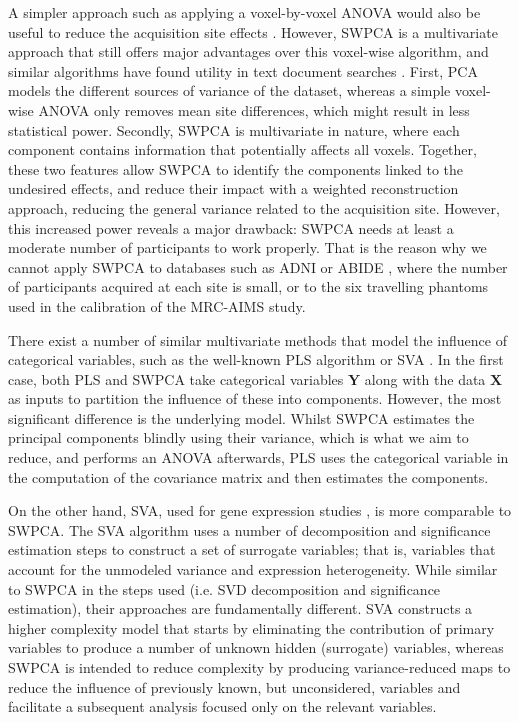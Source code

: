 A simpler approach such as applying a voxel-by-voxel \ac{ANOVA} would also be useful to reduce the acquisition site effects \cite{Suckling2012}. However, \ac{SWPCA} is a multivariate approach that still offers major advantages over this voxel-wise algorithm, and similar algorithms have found utility in text document searches \cite{Kriegel2008,tavoli2013}. First, \ac{PCA} models the different sources of variance of the dataset, whereas a simple voxel-wise \ac{ANOVA} only removes mean site differences, which might result in less statistical power. Secondly, \ac{SWPCA} is multivariate in nature, where each component contains information that potentially affects all voxels. Together, these two features allow \ac{SWPCA} to identify the components linked to the undesired effects, and reduce their impact with a weighted reconstruction approach, reducing the general variance related to the acquisition site. However, this increased power reveals a major drawback: \ac{SWPCA} needs at least a moderate number of participants to work properly. That is the reason why we cannot apply \ac{SWPCA} to databases such as \ac{ADNI} \cite{friedman2006report} or ABIDE \cite{DiMartino2014}, where the number of participants acquired at each site is small, or to the six travelling phantoms used in the calibration of the \ac{MRC-AIMS} study. 

There exist a number of similar multivariate methods that model the influence of categorical variables, such as the well-known \acf{PLS} algorithm \cite{vinzi2010} or \acf{SVA} \cite{Leek2007}. In the first case, both \ac{PLS} and \ac{SWPCA} take categorical variables $\mathbf{Y}$ along with the data $\mathbf{X}$ as inputs to partition the influence of these into components. However, the most significant difference is the underlying model. Whilst \ac{SWPCA} estimates the principal components blindly using their variance, which is what we aim to reduce, and performs an \ac{ANOVA} afterwards, \ac{PLS} uses the categorical variable in the computation of the covariance matrix and then estimates the components. 


On the other hand, \ac{SVA}, used for gene expression studies \cite{Leek2007}, is more comparable to \ac{SWPCA}. The \ac{SVA} algorithm uses a number of decomposition and significance estimation steps to construct a set of surrogate variables; that is, variables that account for the unmodeled variance and expression heterogeneity. While similar to \ac{SWPCA} in the steps used (i.e. \ac{SVD} decomposition and significance estimation), their approaches are fundamentally different. \ac{SVA} constructs a higher complexity model that starts by eliminating the contribution of primary variables to produce a number of unknown hidden (surrogate) variables, whereas \ac{SWPCA} is intended to reduce complexity by producing variance-reduced maps to reduce the influence of previously known, but unconsidered, variables and facilitate a subsequent analysis focused only on the relevant variables.

